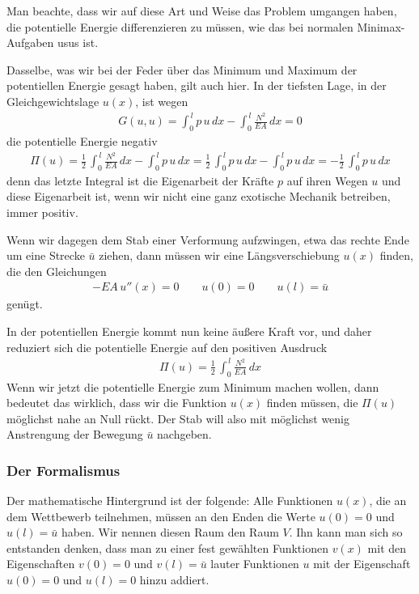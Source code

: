 Man beachte, dass wir auf diese Art und Weise das Problem umgangen haben, die potentielle Energie differenzieren zu m\"{u}ssen, wie das bei normalen Minimax-Aufgaben usus ist.

Dasselbe, was wir bei der Feder \"{u}ber das Minimum und Maximum der potentiellen Energie gesagt haben, gilt auch hier. In der tiefsten Lage, in der Gleichgewichtslage $u(x)$, ist wegen
\begin{align}
G(u,u) = \int_0^{\,l} p\,u\,dx - \int_0^{\,l} \frac{N^2}{EA}\,dx = 0
\end{align}
die potentielle Energie negativ
\begin{align}
\Pi(u) = \frac{1}{2}\, \int_0^{\,l} \frac{N^2}{EA}\,dx - \int_0^{\,l} p\,u\,dx = \frac{1}{2}\,\int_0^{\,l} p\,u\,dx - \int_0^{\,l} p\,u\,dx = - \frac{1}{2}\,\int_0^{\,l} p\,u\,dx
\end{align}
denn das letzte Integral ist die Eigenarbeit der Kr\"{a}fte $p$ auf ihren Wegen $u$ und diese Eigenarbeit ist, wenn wir nicht eine ganz exotische Mechanik betreiben, immer positiv.

Wenn wir dagegen dem Stab einer Verformung aufzwingen, etwa das rechte Ende um eine Strecke $\bar{u} $ ziehen, dann m\"{u}ssen wir eine L\"{a}ngsverschiebung $ u(x) $ finden, die den Gleichungen
\begin{align}
- EA\,u''(x) = 0 \qquad u(0) = 0 \qquad u(l) = \bar{u}
\end{align}
gen\"{u}gt.

In der potentiellen Energie kommt nun keine \"{a}u{\ss}ere Kraft vor, und daher reduziert sich die potentielle Energie auf den positiven Ausdruck
\begin{align}
\Pi(u) = \frac{1}{2}\, \int_0^{\,l} \frac{N^2}{EA}\,dx
\end{align}
Wenn wir jetzt die potentielle Energie zum Minimum machen wollen, dann bedeutet das wirklich, dass wir die Funktion $ u(x) $ finden m\"{u}ssen, die $\Pi(u) $ m\"{o}glichst nahe an Null r\"{u}ckt. Der Stab will also mit m\"{o}glichst wenig Anstrengung der Bewegung $\bar{u} $ nachgeben.

\subsubsection{Der Formalismus}
Der mathematische Hintergrund ist der folgende: Alle Funktionen $u(x)$, die an dem Wettbewerb teilnehmen, m\"{u}ssen an den Enden die Werte $u(0) = 0$ und $u(l) = \bar{u}$ haben. Wir nennen diesen Raum den Raum $ V $. Ihn kann man sich so entstanden denken, dass man zu einer fest gew\"{a}hlten Funktionen $v(x)$ mit den Eigenschaften $v(0) = 0$ und $v(l) = \bar{u}$ lauter Funktionen $u$ mit der Eigenschaft $u(0) = 0$ und $u(l) = 0$ hinzu addiert.

